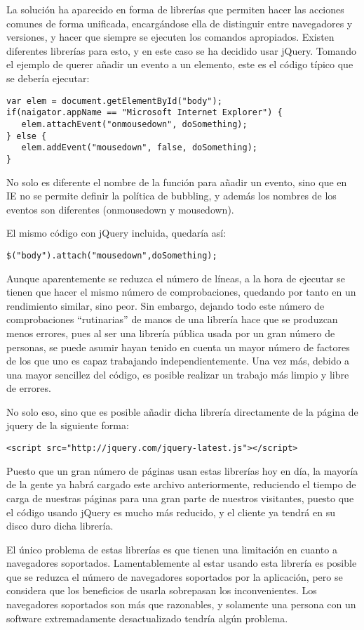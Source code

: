 La solución ha aparecido en forma de librerías que permiten hacer las acciones comunes de forma unificada, encargándose ella de distinguir entre navegadores y versiones, y hacer que siempre se ejecuten los comandos apropiados. Existen diferentes librerías para esto, y en este caso se ha decidido usar jQuery. Tomando el ejemplo de querer añadir un evento a un elemento, este es el código típico que se debería ejecutar:

\begin{verbatim}
var elem = document.getElementById("body");
if(naigator.appName == "Microsoft Internet Explorer") {
   elem.attachEvent("onmousedown", doSomething);
} else {
   elem.addEvent("mousedown", false, doSomething);
}
\end{verbatim}

No solo es diferente el nombre de la función para añadir un evento, sino que en IE no se permite definir la política de bubbling, y además los nombres de los eventos son diferentes (onmousedown y mousedown).

El mismo código con jQuery incluida, quedaría así:

\begin{verbatim}
$("body").attach("mousedown",doSomething);
\end{verbatim}

Aunque aparentemente se reduzca el número de líneas, a la hora de ejecutar se tienen que hacer el mismo número de comprobaciones, quedando por tanto en un rendimiento similar, sino peor. Sin embargo, dejando todo este número de comprobaciones ``rutinarias'' de manos de una librería hace que se produzcan menos errores, pues al ser una librería pública usada por un gran número de personas, se puede asumir hayan tenido en cuenta un mayor número de factores de los que uno es capaz trabajando independientemente. Una vez más, debido a una mayor sencillez del código, es posible realizar un trabajo más limpio y libre de errores.

No solo eso, sino que es posible añadir dicha librería directamente de la página de jquery de la siguiente forma:

\begin{verbatim}
<script src="http://jquery.com/jquery-latest.js"></script>
\end{verbatim}

Puesto que un gran número de páginas usan estas librerías hoy en día, la mayoría de la gente ya habrá cargado este archivo anteriormente, reduciendo el tiempo de carga de nuestras páginas para una gran parte de nuestros visitantes, puesto que el código usando jQuery es mucho más reducido, y el cliente ya tendrá en su disco duro dicha librería.

El único problema de estas librerías es que tienen una limitación en cuanto a navegadores soportados. Lamentablemente al estar usando esta librería es posible que se reduzca el número de navegadores soportados por la aplicación, pero se considera que los beneficios de usarla sobrepasan los inconvenientes. Los navegadores soportados son más que razonables, y solamente una persona con un software extremadamente desactualizado tendría algún problema.
